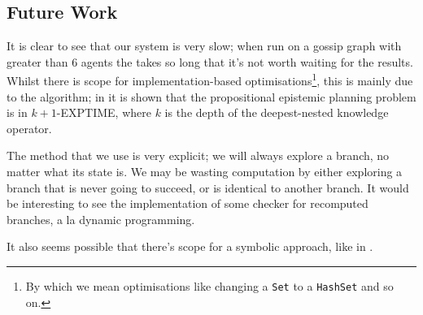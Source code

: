 \documentclass[12pt, a4paper]{article}
\begin{document}
\subsection{Future Work}

It is clear to see that our system is very slow; when run on a gossip graph with
greater than 6 agents the takes so long that it's not worth waiting for the
results. Whilst there is scope for implementation-based
optimisations\footnote{By which we mean optimisations like changing a
  \texttt{Set} to a \texttt{HashSet} and so on.}, this is mainly due to the
algorithm; in \cite{AutomataTechniques} it is shown that the propositional
epistemic planning problem is in \textsf{$k + 1$-EXPTIME}, where $k$ is the
depth of the deepest-nested knowledge operator. 

The method that we use is very explicit; we will always explore a branch, no
matter what its state is. We may be wasting computation by either exploring a
branch that is never going to succeed, or is identical to another branch. It
would be interesting to see the implementation of some checker for recomputed
branches, a la dynamic programming.

\bigskip

It also seems possible that there's scope for a symbolic approach, like in
\cite{MalvinThesis}.


\newpage

\printbibliography[title={Bibliography}]
\end{document}
